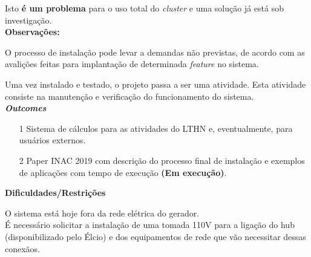Isto \textbf{é um problema} para o uso total do \textit{cluster} e uma solução já 
está sob investigação.\\ 

\textbf{Observações:}

O processo de instalação pode levar a demandas não previstas, de acordo com as avalições feitas para implantação de determinada \textit{feature} no sistema.

Uma vez instalado e testado, o projeto passa a ser uma atividade. Esta atividade 
consiste na manutenção e verificação do funcionamento do sistema.\\

\textbf{\textit{Outcomes}}

\begin{itemize}
	\item[1] Sistema de cálculos para as atividades do LTHN e, eventualmente, para usuários externos.
	\item[2] Paper INAC 2019 com descrição do processo final de instalação e exemplos de aplicações com tempo de execução \textbf{(Em execução)}.

\end{itemize}


\textbf{Dificuldades/Restrições}

O sistema está hoje fora da rede elétrica do gerador.\\



É necessário solicitar a instalação de uma tomada 110V para a ligação do hub 
(disponibilizado pelo Élcio) e dos equipamentos de rede que vão necessitar 
dessas conexãos.\\


